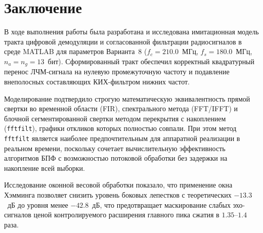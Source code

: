 \section*{Заключение}

В ходе выполнения работы была разработана и исследована имитационная модель тракта цифровой демодуляции и согласованной фильтрации радиосигналов в среде MATLAB для параметров Варианта~8 ($f_c = 210.0$~МГц, $f_s = 180.0$~МГц, $n_a = n_g = 13$~бит). Сформированный тракт обеспечил корректный квадратурный перенос ЛЧМ-сигнала на нулевую промежуточную частоту и подавление внеполосных составляющих КИХ-фильтром нижних частот.

Моделирование подтвердило строгую математическую эквивалентность прямой свертки во временной области (FIR), спектрального метода (FFT/IFFT) и блочной сегментированной свертки методом перекрытия с накоплением (\texttt{fftfilt}), графики откликов которых полностью совпали. При этом метод \texttt{fftfilt} является наиболее предпочтительным для аппаратной реализации в реальном времени, поскольку сочетает вычислительную эффективность алгоритмов БПФ с возможностью потоковой обработки без задержки на накопление всей выборки.

Исследование оконной весовой обработки показало, что применение окна Хэмминга позволяет снизить уровень боковых лепестков с теоретических $-13.3$~дБ до уровня менее $-42.8$~дБ, что предотвращает маскирование слабых эхо-сигналов ценой контролируемого расширения главного пика сжатия в $1.35$--$1.4$ раза.
